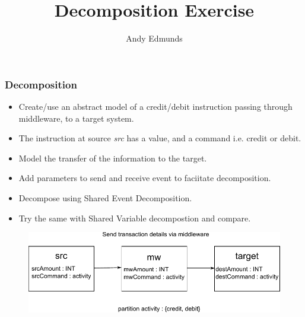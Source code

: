 \documentclass{beamer}
\title{Decomposition Exercise}
\author{Andy Edmunds}
\institute{ University of Southampton }
\begin{document}
\begin{frame}

\titlepage

\end{frame}



\begin{frame}

\frametitle{Decomposition}
\begin{itemize}
\item Create/use an abstract model of a credit/debit instruction passing through middleware, to a target system.
\item The instruction at source \emph{src} has a value, and a command i.e. credit or debit.
\item Model the transfer of the information to the target.
\item Add parameters to send and receive event to faciitate decomposition. 
\item Decompose using Shared Event Decomposition.
\end{itemize}

\begin{itemize}
\item Try the same with Shared Variable decompostion and compare.
\end{itemize}

\begin{figure}
	\includegraphics[scale=0.5]{Overview}
\end{figure}
\end{frame}
\end{document}

